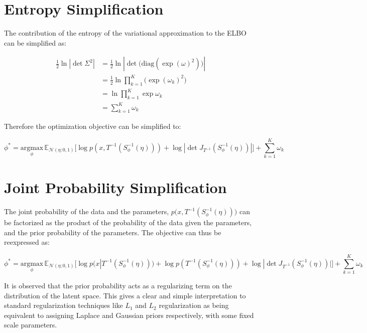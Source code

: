 \documentclass[10pt]{article}
\begin{document}
\section*{Entropy Simplification}

The contribution of the entropy of the variational approximation to the ELBO can be simplified as:

\begin{align*}
  \frac{1}{2}\ln| \det \Sigma ^ 2| &= \frac{1}{2}\ln |\det \big(\text{diag}(\exp(\omega) ^ 2)\big)|  \\
  &= \frac{1}{2}\ln \prod_{k=1}^{K}\big(\exp(\omega_k)^2\big) \\
  &= \ln \prod_{k=1}^{K}\exp \omega_k \\
  &= \sum_{k=1}^{K}\omega_k
\end{align*}

Therefore the optimization objective can be simplified to:

\begin{equation*}
  \phi^* = \underset{\phi}{\text{argmax}} \, \mathbb{E}_{\mathcal{N}(\eta; 0, 1)}\big[\log p(x, T^{-1}(S_\phi^{-1}(\eta))) + \log |\det J_{T^{-1}}(S_\phi^{-1}(\eta))|\big] + \sum_{k=1}^{K}\omega_k
\end{equation*}

\section*{Joint Probability Simplification}

The joint probability of the data and the parameters, $p\big(x, T^{-1}(S_\phi^{-1}(\eta))\big)$ can be factorized as the product 
of the probability of the data given the parameters, and the prior probability of the parameters. The objective can thus be 
reexpressed as:

\begin{equation*}
  \phi^* = \underset{\phi}{\text{argmax}} \, \mathbb{E}_{\mathcal{N}(\eta; 0, 1)}\big[\log p(x | T^{-1}(S_\phi^{-1}(\eta))) + \log p(T^{-1}(S_\phi^{-1}(\eta))) + \log |\det J_{T^{-1}}(S_\phi^{-1}(\eta))|\big] + \sum_{k=1}^{K}\omega_k
\end{equation*}


It is observed that the prior probability acts as a regularizing term on the distribution of the latent space. This gives 
a clear and simple interpretation to standard regularization techniques like $L_1$ and $L_2$ regularization as being equivalent to 
assigning Laplace and Gaussian priors respectively, with some fixed scale parameters. 
\end{document}
